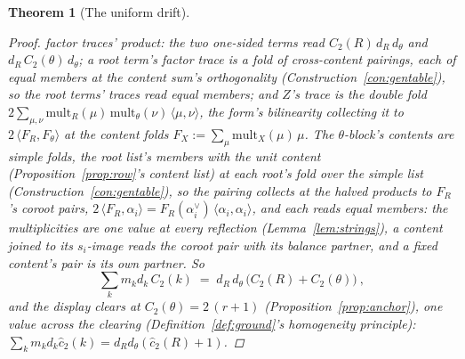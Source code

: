 \documentclass[11pt]{article}
\newtheorem{theorem}{Theorem}
\theoremstyle{definition}
\begin{document}
\begin{theorem}[The uniform drift]
\begin{proof}
factor traces' product: the two one-sided terms read
$C_2(R)\,d_R\,d_\theta$ and $d_R\,C_2(\theta)\,d_\theta$; a root
term's factor trace is a fold of cross-content pairings, each of
equal members at the content sum's orthogonality
(Construction~\ref{con:gentable}), so the root terms' traces read
equal members; and $Z$'s trace is the double fold
$2\sum_{\mu,\nu}\mathrm{mult}_R(\mu)\,\mathrm{mult}_\theta(\nu)\,
\langle\mu,\nu\rangle$, the form's bilinearity collecting it to
$2\,\langle F_R,F_\theta\rangle$ at the content folds
$F_X:=\sum_\mu\mathrm{mult}_X(\mu)\,\mu$. The $\theta$-block's
contents are simple folds, the root list's members with the unit
content (Proposition~\ref{prop:row}'s content list) at each
root's fold over the simple list
(Construction~\ref{con:gentable}), so
the pairing collects at the halved products to $F_R$'s coroot
pairs, $2\,\langle F_R,\alpha_i\rangle
=F_R(\alpha_i^\vee)\,\langle\alpha_i,\alpha_i\rangle$, and each
reads equal members: the multiplicities are one value at every
reflection (Lemma~\ref{lem:strings}), a content joined to its
$s_i$-image reads the coroot pair with its balance partner, and a
fixed content's pair is its own partner. So
\[
\sum_km_kd_k\,C_2(k)\;=\;d_R\,d_\theta\,
\big(C_2(R)+C_2(\theta)\big)\ ,
\]
and the display clears at $C_2(\theta)=2\,(r+1)$
(Proposition~\ref{prop:anchor}), one value across the clearing
(Definition~\ref{def:ground}'s homogeneity principle):
$\sum_km_kd_k\hat c_2(k)=d_Rd_\theta(\hat c_2(R)+1)$.


\end{proof}
\end{theorem}
\end{document}
